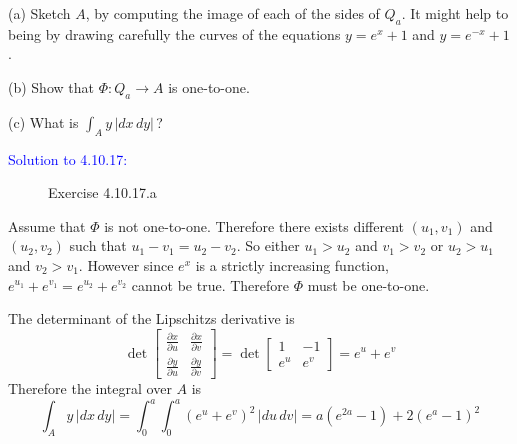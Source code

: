 \documentclass[12pt]{article}
\newcommand{\pder}[2]{\frac{\partial #1}{\partial #2}}
\begin{document}
(a) Sketch $A$, by computing the image of each of the sides of $Q_a$.
It might help to being by drawing carefully the curves of
the equations $y=e^{x}+1$ and $y=e^{-x}+1$.

(b) Show that $\Phi : Q_a \to A$ is one-to-one.

(c) What is $\displaystyle \int_A y \, |dx\,dy|$\,?
\medskip

\textcolor{blue}{Solution to 4.10.17:}
\begin{figure}[ht!]
    \centering
{}
    \caption{Exercise 4.10.17.a}
\end{figure}

Assume that $\Phi$ is not one-to-one.
Therefore there exists different $(u_1, v_1)$ and $(u_2, v_2)$ such that 
$u_1-v_1 = u_2 - v_2$. 
So either $u_1 > u_2$ and $v_1 > v_2$ or $u_2 > u_1$ and $v_2 > v_1$.
However since $e^x$ is a strictly increasing function, 
$e^{u_1}+e^{v_1} = e^{u_2}+e^{v_2}$ cannot be true.
Therefore $\Phi$ must be one-to-one.

The determinant of the Lipschitzs derivative is 
\[
    \det 
    \begin{bmatrix}
        \pder{x}{u} & \pder{x}{v} \\
        \pder{y}{u} & \pder{y}{v}
    \end{bmatrix} =
    \det 
    \begin{bmatrix}
        1 & -1 \\
        e^u & e^v
    \end{bmatrix} =
    e^u + e^v
\]
Therefore the integral over $A$ is
\[
    \int_A y \, |dx\,dy|
    = \int_0^a \int_0^a (e^u + e^v)^2\,|du\,dv|
    = a(e^{2a}-1) + 2(e^a-1)^2
\]
\end{document}
